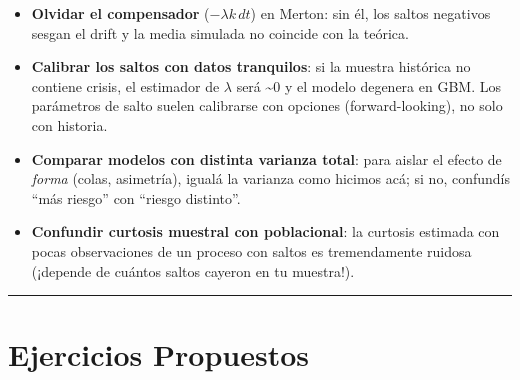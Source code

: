 \documentclass[
  spanish,
  letterpaper,
  DIV=11,
  numbers=noendperiod]{scrreprt}
\providecommand{\tightlist}{%
  \setlength{\itemsep}{0pt}\setlength{\parskip}{0pt}}
\begin{document}
\begin{tcolorbox}[enhanced jigsaw, bottomrule=.15mm, colback=white, opacitybacktitle=0.6, arc=.35mm, toprule=.15mm, opacityback=0, breakable, titlerule=0mm, left=2mm, coltitle=black, colbacktitle=quarto-callout-warning-color!10!white, colframe=quarto-callout-warning-color-frame, leftrule=.75mm, toptitle=1mm, bottomtitle=1mm, title=\textcolor{quarto-callout-warning-color}{\faExclamationTriangle}\hspace{0.5em}{Trampas frecuentes}, rightrule=.15mm]

\begin{itemize}
\tightlist
\item
  \textbf{Olvidar el compensador} (\(-\lambda k\, dt\)) en Merton: sin
  él, los saltos negativos sesgan el drift y la media simulada no
  coincide con la teórica.
\item
  \textbf{Calibrar los saltos con datos tranquilos}: si la muestra
  histórica no contiene crisis, el estimador de \(\lambda\) será
  \textasciitilde0 y el modelo degenera en GBM. Los parámetros de salto
  suelen calibrarse con opciones (forward-looking), no solo con
  historia.
\item
  \textbf{Comparar modelos con distinta varianza total}: para aislar el
  efecto de \emph{forma} (colas, asimetría), igualá la varianza como
  hicimos acá; si no, confundís ``más riesgo'' con ``riesgo distinto''.
\item
  \textbf{Confundir curtosis muestral con poblacional}: la curtosis
  estimada con pocas observaciones de un proceso con saltos es
  tremendamente ruidosa (¡depende de cuántos saltos cayeron en tu
  muestra!).
\end{itemize}

\end{tcolorbox}

\begin{center}\rule{0.5\linewidth}{0.5pt}\end{center}

\chapter{Ejercicios Propuestos}\label{ejercicios-propuestos-13}
\end{document}

